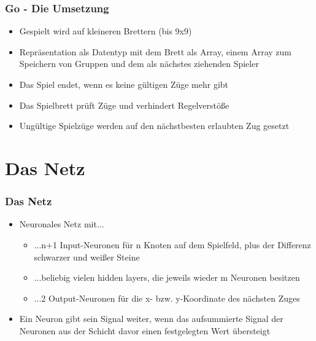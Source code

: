 \documentclass[compress]{beamer}
\begin{document}
\begin{frame}
	\frametitle{Go - Die Umsetzung}
	
	\begin{itemize}
		\item Gespielt wird auf kleineren Brettern (bis 9x9)
		\item Repräsentation als Datentyp mit dem Brett als Array, einem Array zum Speichern von Gruppen und dem als nächstes ziehenden Spieler
		\item Das Spiel endet, wenn es keine gültigen Züge mehr gibt
		\item Das Spielbrett prüft Züge und verhindert Regelverstöße
		\item Ungültige Spielzüge werden auf den nächstbesten erlaubten Zug gesetzt
	\end{itemize}		
	
\end{frame}

\section{Das Netz}

\begin{frame}[fragile]
	\frametitle{Das Netz}

	\begin{itemize}
		\item Neuronales Netz mit...

		\begin{itemize}
			\item ...n+1 Input-Neuronen für n Knoten auf dem Spielfeld, plus der Differenz schwarzer und weißer Steine
			\item ...beliebig vielen hidden layers, die jeweils wieder m Neuronen besitzen
			\item ...2 Output-Neuronen für die x- bzw. y-Koordinate des nächsten Zuges
		\end{itemize}

		\item Ein Neuron gibt sein Signal weiter, wenn das aufsummierte Signal der Neuronen aus der Schicht davor einen festgelegten Wert übersteigt
	\end{itemize}
\end{frame}
\end{document}
